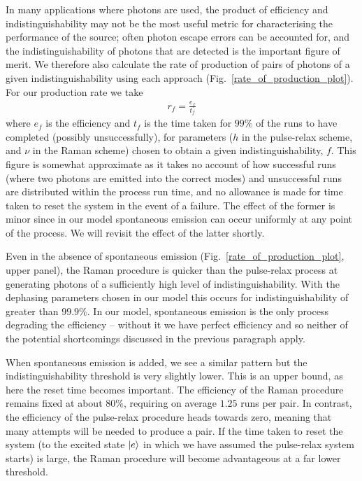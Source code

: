 In many applications where photons are used, the product of efficiency and indistinguishability may not be the most useful metric for characterising the performance of the source; often photon escape errors can be accounted for, and the indistinguishability of photons that are detected is the important figure of merit. We therefore also calculate the rate of production of pairs of photons of a given indistinguishability using each approach (Fig.~\ref{rate_of_production_plot}). For our production rate we take
\begin{eqnarray}
  r_f = \frac{e_f}{t_f}
\end{eqnarray}
where $e_f$ is the efficiency and $t_f$ is the time taken for $99\%$ of the runs to have completed (possibly unsuccessfully), for parameters ($h$ in the pulse-relax scheme, and $\nu$ in the Raman scheme) chosen to obtain a given indistinguishability, $f$. This figure is somewhat approximate as it takes no account of how successful runs (where two photons are emitted into the correct modes) and unsuccessful runs are distributed within the process run time, and no allowance is made for time taken to reset the system in the event of a failure. The effect of the former is minor since in our model spontaneous emission can occur uniformly at any point of the process. We will revisit the effect of the latter shortly.

Even in the absence of spontaneous emission (Fig.~\ref{rate_of_production_plot}, upper panel), the Raman procedure is quicker than the pulse-relax process at generating photons of a sufficiently high level of indistinguishability. With the dephasing parameters chosen in our model this occurs for indistinguishability of greater than $99.9\%$. In our model, spontaneous emission is the only process degrading the efficiency -- without it we have perfect efficiency and so neither of the potential shortcomings discussed in the previous paragraph apply.

When spontaneous emission is added, we see a similar pattern but the indistinguishability threshold is very slightly lower. This is an upper bound, as here the reset time becomes important. The efficiency of the Raman procedure remains fixed at about $80\%$, requiring on average $1.25$ runs per pair. In contrast, the efficiency of the pulse-relax procedure heads towards zero, meaning that many attempts will be needed to produce a pair. If the time taken to reset the system (to the excited state $\left\vert e\right\rangle$ in which we have assumed the pulse-relax system starts) is large, the Raman procedure will become advantageous at a far lower threshold.

